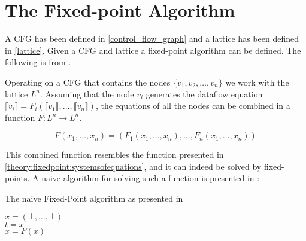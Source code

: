 \section{The Fixed-point Algorithm}\label{fixed_point_algorithm}
A CFG has been defined in \cref{control_flow_graph} and a lattice has been defined in \cref{lattice}.
Given a CFG and lattice a fixed-point algorithm can be defined.
The following is from \citet{schwartzbach}.


Operating on a CFG that contains the nodes $\{ v_1, v_2, \dots, v_n \}$ we work with the lattice $L^n$.
Assuming that the node $v_i$ generates the dataflow equation $\llbracket v_i \rrbracket = F_i ( \llbracket v_1 \rrbracket, \dots, \llbracket v_n \rrbracket)$, the equations of all the nodes can be combined in a function $ F: L^n \rightarrow L^n$.

\[ F(x_1, \dots, x_n) = (F_1(x_1, \dots, x_n), \dots, F_n(x_1, \dots, x_n)) \]

This combined function resembles the function presented in \cref{theory:fixedpoint:systemsofequations}, and it can indeed be solved by fixed-points.
A naive algorithm for solving such a function is presented in \citet{schwartzbach}:

\begin{algorithm}
  \caption{The naive Fixed-Point algorithm as presented in \citet[p.18~]{schwartzbach}}\label{fixed-point_algo}  
  \DontPrintSemicolon
  $x = (\bot, \dots, \bot)$ \\
         {
           $t = x$\\
           $x = F(x)$
         }
\end{algorithm}


